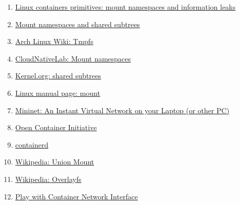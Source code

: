 \documentclass[12pt]{article}
\begin{document}
\begin{enumerate}
		\item
		\label{bib: mount namespace info 1}
		\href{https://www.schutzwerk.com/en/43/posts/namespaces_02_mnt/}{Linux containers primitives: mount namespaces and information leaks}
		
		\item
		\label{bib: mount namespace info 2}
		\href{https://lwn.net/Articles/689856/}{Mount namespaces and shared subtrees}
		
		\item
		\label{bib: tmpfs arch linux}
		\href{https://wiki.archlinux.org/title/Tmpfs}{Arch Linux Wiki: Tmpfs}
		
		\item
		\label{bib: mount namespaces containerlabs}
		\href{https://www.containerlabs.kubedaily.com/LXC/Linux%20Containers/Mount-namespaces.html}{CloudNativeLab: Mount namespaces}
		
		\item
		\label{bib: mount namespaces shared subtree}
		\href{https://www.kernel.org/doc/Documentation/filesystems/sharedsubtree.txt}{Kernel.org: shared subtrees}
		
		\item
		\label{bib: mount namespaces shared subtree 2}
		\href{https://man7.org/linux/man-pages/man8/mount.8.html}{Linux manual page: mount}
		
		\item
		\label{bib: mininet home page}
		\href{http://mininet.org/}{Mininet: An Instant Virtual Network on your Laptop (or other PC)}
		
		\item
		\label{bib: oci}
		\href{https://opencontainers.org/}{Open Container Initiative}
		
		\item
		\label{bib: containerd}
		\href{https://containerd.io/}{containerd}
		
		\item
		\label{bib: union mount}
		\href{https://en.wikipedia.org/wiki/Union_mount}{Wikipedia: Union Mount}
		
		\item
		\label{bib: overlayfs}
		\href{https://en.wikipedia.org/wiki/OverlayFS}{Wikipedia: Overlayfs}
		
		\item
		\label{bib: docker y namespaces}
		\href{https://arthurchiao.art/blog/play-with-container-network-if/}{Play with Container Network Interface}
		

\end{enumerate}
\end{document}
